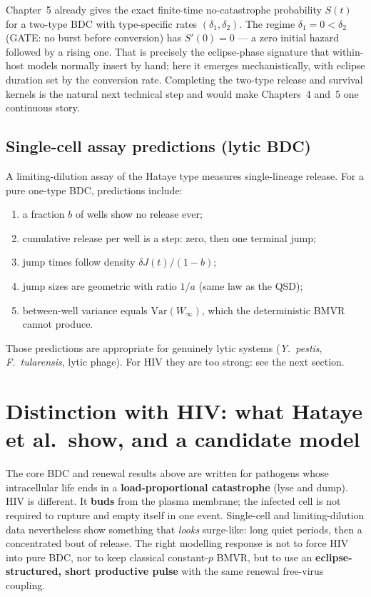 \documentclass[11pt,a4paper]{article}
\theoremstyle{plain}
\theoremstyle{definition}
\theoremstyle{remark}
\begin{document}
Chapter~5 already gives the exact finite-time no-catastrophe probability $S(t)$
for a two-type BDC with type-specific rates $(\delta_1,\delta_2)$. The regime
$\delta_1=0<\delta_2$ (GATE: no burst before conversion) has $S'(0)=0$ --- a
zero initial hazard followed by a rising one. That is precisely the eclipse-phase
signature that within-host models normally insert by hand; here it emerges
mechanistically, with eclipse duration set by the conversion rate. Completing
the two-type release and survival kernels is the natural next technical step
and would make Chapters~4 and~5 one continuous story.

\subsection{Single-cell assay predictions (lytic BDC)}

A limiting-dilution assay of the Hataye type measures single-lineage release.
For a pure one-type BDC, predictions include:
\begin{enumerate}
\item a fraction $b$ of wells show no release ever;
\item cumulative release per well is a step: zero, then one terminal jump;
\item jump times follow density $\delta J(t)/(1-b)$;
\item jump sizes are geometric with ratio $1/a$ (same law as the QSD);
\item between-well variance equals $\mathrm{Var}(W_\infty)$, which the
deterministic BMVR cannot produce.
\end{enumerate}
Those predictions are appropriate for genuinely lytic systems
(\textit{Y.~pestis}, \textit{F.~tularensis}, lytic phage). For HIV they are
too strong: see the next section.

\section{Distinction with HIV: what Hataye et al.\ show, and a candidate model}
\label{sec:hiv}

The core BDC and renewal results above are written for pathogens whose
intracellular life ends in a \textbf{load-proportional catastrophe} (lyse and dump).
HIV is different. It \textbf{buds} from the plasma membrane; the infected cell is not
required to rupture and empty itself in one event. Single-cell and limiting-dilution
data nevertheless show something that \emph{looks} surge-like: long quiet periods,
then a concentrated bout of release. The right modelling response is not to force HIV
into pure BDC, nor to keep classical constant-$p$ BMVR, but to use an
\textbf{eclipse-structured, short productive pulse} with the same renewal free-virus
coupling.
\end{document}
